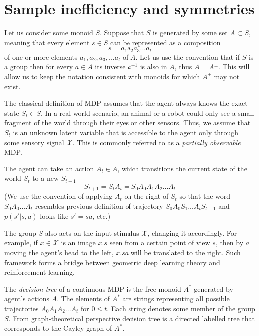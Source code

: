 \documentclass[oneside,english,logo]{amuthesis}
\begin{document}
\section{Sample inefficiency and symmetries}

Let us consider some monoid $S$. Suppose that $S$ is generated by some set $A \subset S$, meaning that every element $s\in S$ can be represented as a composition 
\[
s = a_1 a_2 a_3 ... a_t
\]
of one or more elements $a_1,a_2,a_3,...a_t$ of $A$. Let us use the convention that if $S$ is a group then for every $a\in A$ its inverse $a^{-1}$ is also in $A$, thus $A=A^{\pm}$. This will allow us to keep the notation consistent with monoids for which $A^{\pm}$ may not exist.  

The classical definition of MDP assumes that the agent always knows the exact state $S_t \in S$. In a real world scenario, an animal or a robot could only see a small fragment of the world through their eyes or other sensors. Thus, we assume that $S_t$ is an unknown latent variable that is accessible to the agent only through some sensory signal $\mathcal{X}$. This is commonly referred to as a \textit{partially observable} MDP. 

The agent can take an action $A_t\in A$, which transitions the current state of the world $S_t$ to a new $S_{t+1}$
\[
S_{t+1} = S_{t}A_t = S_0 A_0 A_1 A_2 ... A_t
\]
(We use the convention of applying $A_t$ on the right of $S_t$ so that the word $S_0 A_0...A_t$ resembles previous definition of trajectory $S_0 A_0S_1...A_tS_{t+1}$ and $p(s'|s,a)$ looks like $s'=sa$, etc.)

The group $S$ also acts on the input stimulus $\mathcal{X}$, changing it accordingly. For example, if $x\in\mathcal{X}$ is an image $x.s$ seen from a certain point of view $s$, then by $a$ moving the agent's head to the left, $x.sa$ will be translated to the right.  Such framework forms a bridge between geometric deep learning theory and reinforcement learning.

The \textit{decision tree} of a continuous MDP is the free monoid $A^*$ generated by agent's actions $A$. The elements of $A^*$ are strings representing all possible trajectories $ A_0 A_1 A_2 ... A_t$ for $0\le t$.  Each string denotes some member of the group $S$. From graph-theoretical perspective decision tree is a directed labelled tree that corresponds to the Cayley graph of $A^*$. 
\end{document}
